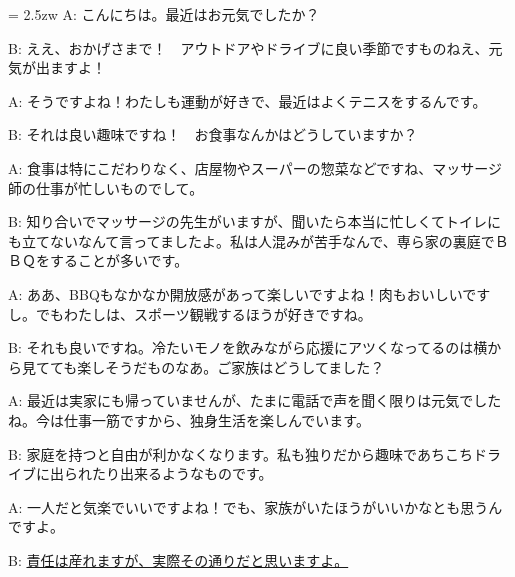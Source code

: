 \documentclass[11pt]{amsart}
\title{}
\author{}
\newenvironment{hangall}[1]{\hangindent = 2.5zw\everypar{\hangindent = 2.5zw}}{}
\begin{document}
\maketitle
\begin{hangall}{}%
A: こんにちは。最近はお元気でしたか？

B: ええ、おかげさまで！　アウトドアやドライブに良い季節ですものねえ、元気が出ますよ！

A: そうですよね！わたしも運動が好きで、最近はよくテニスをするんです。

B: それは良い趣味ですね！　お食事なんかはどうしていますか？

A: 食事は特にこだわりなく、店屋物やスーパーの惣菜などですね、マッサージ師の仕事が忙しいものでして。

B: 知り合いでマッサージの先生がいますが、聞いたら本当に忙しくてトイレにも立てないなんて言ってましたよ。私は人混みが苦手なんで、専ら家の裏庭でＢＢＱをすることが多いです。

A: ああ、BBQもなかなか開放感があって楽しいですよね！肉もおいしいですし。でもわたしは、スポーツ観戦するほうが好きですね。

B: それも良いですね。冷たいモノを飲みながら応援にアツくなってるのは横から見てても楽しそうだものなあ。ご家族はどうしてました？

A: 最近は実家にも帰っていませんが、たまに電話で声を聞く限りは元気でしたね。今は仕事一筋ですから、独身生活を楽しんでいます。

B: 家庭を持つと自由が利かなくなります。私も独りだから趣味であちこちドライブに出られたり出来るようなものです。

A: 一人だと気楽でいいですよね！でも、家族がいたほうがいいかなとも思うんですよ。

B: \ul{責任は産れますが、実際その通りだと思いますよ。}\end{hangall}
\end{document}
